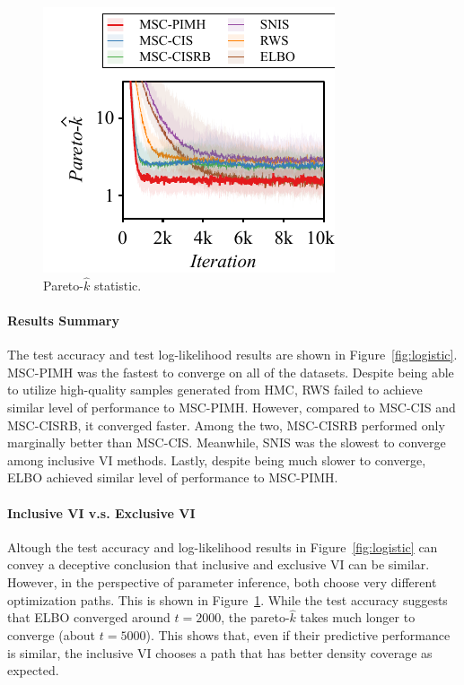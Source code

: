 %
\begin{figure}
  \vspace{-0.3in}
  \includegraphics[scale=0.8]{figures/german_01.pdf}
  \caption{Pareto-\(\widehat{k}\) statistic.}\label{fig:paretok}
  \vspace{-0.1in}
\end{figure}
%
\paragraph{Results Summary}
The test accuracy and test log-likelihood results are shown in Figure~\ref{fig:logistic}.
MSC-PIMH was the fastest to converge on all of the datasets.
Despite being able to utilize high-quality samples generated from HMC, RWS failed to achieve similar level of performance to MSC-PIMH.
However, compared to MSC-CIS and MSC-CISRB, it converged faster.
Among the two, MSC-CISRB performed only marginally better than MSC-CIS.
Meanwhile, SNIS was the slowest to converge among inclusive VI methods.
Lastly, despite being much slower to converge, ELBO achieved similar level of performance to MSC-PIMH.

\paragraph{Inclusive VI v.s. Exclusive VI}
Altough the test accuracy and log-likelihood results in Figure~\ref{fig:logistic} can convey a deceptive conclusion that inclusive and exclusive VI can be similar.
However, in the perspective of parameter inference, both choose very different optimization paths.
This is shown in Figure~\ref{fig:paretok}.
While the test accuracy suggests that ELBO converged around \(t=2000\), the pareto-\(\widehat{k}\) takes much longer to converge (about \(t=5000\)).
This shows that, even if their predictive performance is similar, the inclusive VI chooses a path that has better density coverage as expected.

